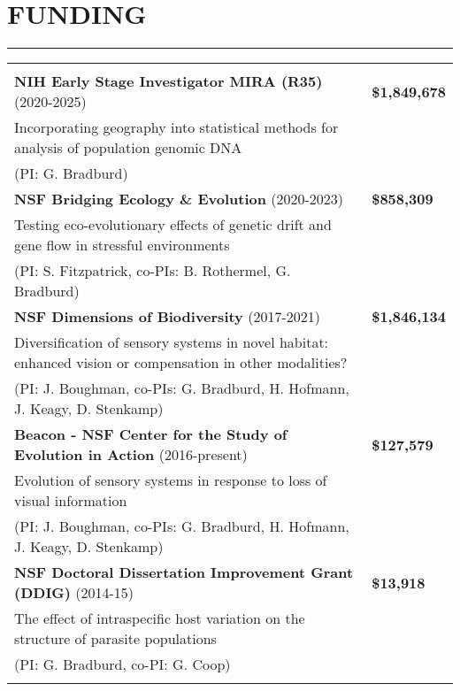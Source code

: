 \documentclass{article}
\begin{document}
\section*{FUNDING}
\vspace{-0.6cm}
\rule{470pt}{0.4pt}
\begin{tabular}{>{\everypar{\hangindent1cm}}p{}p{}}
\hfill\\
%
\textbf{NIH Early Stage Investigator MIRA (R35)} (2020-2025) & \hfill \textbf{\$1,849,678} \\
\hspace{4.5mm} Incorporating geography into statistical methods for analysis of population genomic DNA\\
\hspace{4.5mm}(PI: G. Bradburd)\\ \vspace{-0.1cm}
%
\textbf{NSF Bridging Ecology \& Evolution} (2020-2023) & \hfill \textbf{\$858,309} \\
\hspace{4.5mm} Testing eco-evolutionary effects of genetic drift and gene flow in stressful environments\\
\hspace{4.5mm}(PI: S. Fitzpatrick, co-PIs: B. Rothermel, G. Bradburd)\\ \vspace{-0.1cm}
%
\textbf{NSF Dimensions of Biodiversity} (2017-2021) & \hfill \textbf{\$1,846,134} \\
\hspace{4.5mm}Diversification of sensory systems in novel habitat: enhanced vision or compensation in other modalities?\\
\hspace{4.5mm}(PI: J. Boughman, co-PIs: G. Bradburd, H. Hofmann, J. Keagy, D. Stenkamp)\\ \vspace{-0.1cm}
%
\textbf{Beacon - NSF Center for the Study of Evolution in Action} (2016-present) & \hfill \textbf{\$127,579}\\
\hspace{4.5mm}Evolution of sensory systems in response to loss of visual information\\
\hspace{4.5mm}(PI: J. Boughman, co-PIs: G. Bradburd, H. Hofmann, J. Keagy, D. Stenkamp)\\ \vspace{-0.1cm}
%
\textbf{NSF Doctoral Dissertation Improvement Grant (DDIG)} (2014-15) & \hfill \textbf{\$13,918}\\
\hspace{4.5mm}The effect of intraspecific host variation on the structure of parasite populations\\
\hspace{4.5mm}(PI: G. Bradburd, co-PI: G. Coop)\\ \vspace{-0.1cm}
\end{tabular}
%
\end{document}
